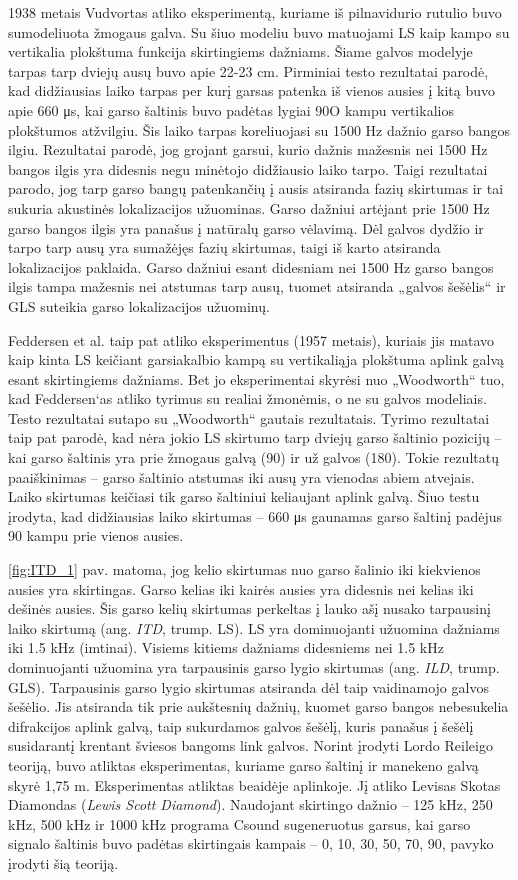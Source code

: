 \documentclass[]{vgtuef}
\begin{document}
1938 metais Vudvortas atliko eksperimentą, kuriame iš pilnavidurio rutulio buvo sumodeliuota žmogaus galva. Su šiuo modeliu buvo matuojami LS kaip kampo su vertikalia plokštuma funkcija skirtingiems dažniams. Šiame galvos modelyje tarpas tarp dviejų ausų buvo apie 22-23 cm. Pirminiai testo rezultatai parodė, kad didžiausias laiko tarpas per kurį garsas patenka iš vienos ausies į kitą buvo apie 660 μs, kai garso šaltinis buvo padėtas lygiai 90O kampu vertikalios plokštumos atžvilgiu. Šis laiko tarpas koreliuojasi su 1500 Hz dažnio garso bangos ilgiu. Rezultatai parodė, jog grojant garsui, kurio dažnis mažesnis nei 1500 Hz bangos ilgis yra didesnis negu minėtojo didžiausio laiko tarpo. Taigi rezultatai parodo, jog tarp garso bangų patenkančių į ausis atsiranda fazių skirtumas ir tai sukuria akustinės lokalizacijos užuominas. Garso dažniui artėjant prie 1500 Hz garso bangos ilgis yra panašus į natūralų garso vėlavimą. Dėl galvos dydžio ir tarpo tarp ausų yra sumažėjęs fazių skirtumas, taigi iš karto atsiranda lokalizacijos paklaida. Garso dažniui esant didesniam nei 1500 Hz garso bangos ilgis tampa mažesnis nei atstumas tarp ausų, tuomet atsiranda „galvos šešėlis“ ir GLS suteikia garso lokalizacijos užuominų.

Feddersen et al. taip pat atliko eksperimentus (1957 metais), kuriais jis matavo kaip kinta LS keičiant garsiakalbio kampą su vertikaliąja plokštuma aplink galvą esant skirtingiems dažniams. Bet jo eksperimentai skyrėsi nuo „Woodworth“ tuo, kad Feddersen‘as atliko tyrimus su realiai žmonėmis, o ne su galvos modeliais. Testo rezultatai sutapo su „Woodworth“ gautais rezultatais. Tyrimo rezultatai taip pat parodė, kad nėra jokio LS skirtumo tarp dviejų garso šaltinio pozicijų – kai garso šaltinis yra prie žmogaus galvą (90) ir už galvos (180). Tokie rezultatų paaiškinimas – garso šaltinio atstumas iki ausų yra vienodas abiem atvejais. Laiko skirtumas keičiasi tik garso šaltiniui keliaujant aplink galvą. Šiuo testu įrodyta, kad didžiausias laiko skirtumas – 660 μs gaunamas garso šaltinį padėjus 90 kampu prie vienos ausies.

\ref{fig:ITD_1} pav. matoma, jog kelio skirtumas nuo garso šalinio iki kiekvienos ausies yra skirtingas. Garso kelias iki kairės ausies yra didesnis nei kelias iki dešinės ausies. Šis garso kelių skirtumas perkeltas į lauko ašį nusako tarpausinį laiko skirtumą (ang. \textit{ITD}, trump. LS).
LS yra dominuojanti užuomina dažniams iki 1.5 kHz (imtinai). Visiems kitiems dažniams didesniems nei 1.5 kHz dominuojanti užuomina yra tarpausinis garso lygio skirtumas (ang. \textit{ILD}, trump. GLS). Tarpausinis garso lygio skirtumas atsiranda dėl taip vaidinamojo galvos šešėlio. Jis atsiranda tik prie aukštesnių dažnių, kuomet garso bangos nebesukelia difrakcijos aplink galvą, taip sukurdamos galvos šešėlį, kuris panašus į šešėlį susidarantį krentant šviesos bangoms link galvos.
Norint įrodyti Lordo Reileigo teoriją, buvo atliktas eksperimentas, kuriame garso šaltinį ir manekeno galvą skyrė 1,75 m. Eksperimentas atliktas beaidėje aplinkoje. Jį atliko Levisas Skotas Diamondas (\textit{Lewis Scott Diamond}).  Naudojant skirtingo dažnio – 125 kHz, 250 kHz, 500 kHz ir 1000 kHz programa Csound sugeneruotus garsus, kai garso signalo šaltinis buvo padėtas skirtingais kampais – 0, 10, 30, 50, 70, 90, pavyko įrodyti šią teoriją.
\end{document}
